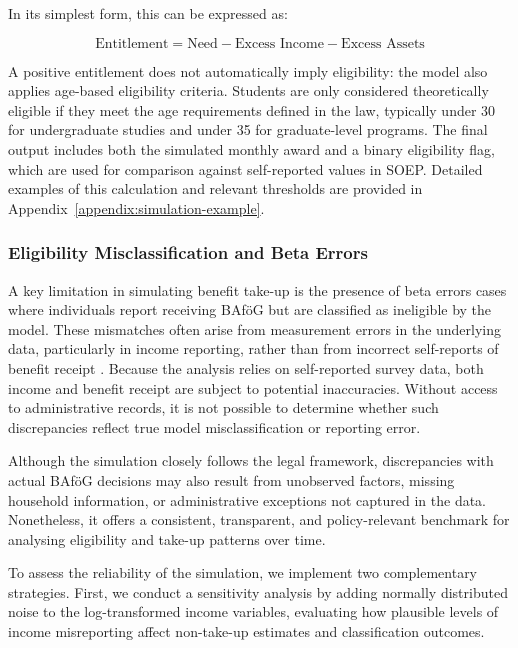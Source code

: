 In its simplest form, this can be expressed as:

\begin{equation}
    \text{Entitlement} = \text{Need} - \text{Excess Income} - \text{Excess Assets}
\end{equation}

A positive entitlement does not automatically imply eligibility: the model also applies age-based eligibility criteria. 
Students are only considered theoretically eligible if they meet the age requirements defined in the law, typically under 30 for undergraduate studies and under 35 for graduate-level programs. 
The final output includes both the simulated monthly award and a binary eligibility flag, which are used for comparison against self-reported values in SOEP. 
Detailed examples of this calculation and relevant thresholds are provided in Appendix~\ref{appendix:simulation-example}.

\subsubsection{Eligibility Misclassification and Beta Errors}
A key limitation in simulating benefit take-up is the presence of beta errors cases where individuals report receiving BAföG but are classified as ineligible by the model. 
These mismatches often arise from measurement errors in the underlying data, particularly in income reporting, rather than from incorrect self-reports of benefit receipt \citep{frick_claim_2007, janssens_takemod_2022}. 
Because the analysis relies on self-reported survey data, both income and benefit receipt are subject to potential inaccuracies. 
Without access to administrative records, it is not possible to determine whether such discrepancies reflect true model misclassification or reporting error.

Although the simulation closely follows the legal framework, discrepancies with actual BAföG decisions may also result from unobserved factors, missing household information, or administrative exceptions not captured in the data. Nonetheless, it offers a consistent, transparent, and policy-relevant benchmark for analysing eligibility and take-up patterns over time.

To assess the reliability of the simulation, we implement two complementary strategies. 
First, we conduct a sensitivity analysis by adding normally distributed noise to the log-transformed income variables, evaluating how plausible levels of income misreporting affect non-take-up estimates and classification outcomes. 

